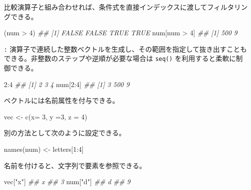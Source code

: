 \documentclass[
  letterpaper,
  xelatex,
  ja=standard, xelatex]{bxjsbook}
\newenvironment{Shaded}{\begin{snugshade}}{\end{snugshade}}
\newcommand{\AttributeTok}[1]{\textcolor[rgb]{0.40,0.45,0.13}{#1}}
\newcommand{\DecValTok}[1]{\textcolor[rgb]{0.68,0.00,0.00}{#1}}
\newcommand{\DocumentationTok}[1]{\textcolor[rgb]{0.37,0.37,0.37}{\textit{#1}}}
\newcommand{\FunctionTok}[1]{\textcolor[rgb]{0.28,0.35,0.67}{#1}}
\newcommand{\NormalTok}[1]{\textcolor[rgb]{0.00,0.23,0.31}{#1}}
\newcommand{\OtherTok}[1]{\textcolor[rgb]{0.00,0.23,0.31}{#1}}
\newcommand{\SpecialCharTok}[1]{\textcolor[rgb]{0.37,0.37,0.37}{#1}}
\newcommand{\StringTok}[1]{\textcolor[rgb]{0.13,0.47,0.30}{#1}}
\begin{document}
比較演算子と組み合わせれば、条件式を直接インデックスに渡してフィルタリングできる。

\begin{Shaded}
\begin{Highlighting}[]
\NormalTok{(num }\SpecialCharTok{\textgreater{}} \DecValTok{4}\NormalTok{)}
\DocumentationTok{\#\# [1] FALSE FALSE  TRUE  TRUE}
\NormalTok{num[num }\SpecialCharTok{\textgreater{}} \DecValTok{4}\NormalTok{]}
\DocumentationTok{\#\# [1] 500   9}
\end{Highlighting}
\end{Shaded}

\texttt{:}
演算子で連続した整数ベクトルを生成し、その範囲を指定して抜き出すこともできる。非整数のステップや逆順が必要な場合は
\texttt{seq()} を利用すると柔軟に制御できる。

\begin{Shaded}
\begin{Highlighting}[]
\DecValTok{2}\SpecialCharTok{:}\DecValTok{4}
\DocumentationTok{\#\# [1] 2 3 4}
\NormalTok{num[}\DecValTok{2}\SpecialCharTok{:}\DecValTok{4}\NormalTok{]}
\DocumentationTok{\#\# [1]   3 500   9}
\end{Highlighting}
\end{Shaded}

ベクトルには名前属性を付与できる。

\begin{Shaded}
\begin{Highlighting}[]
\NormalTok{vec }\OtherTok{\textless{}{-}} \FunctionTok{c}\NormalTok{(}\AttributeTok{x=} \DecValTok{3}\NormalTok{, }\AttributeTok{y =}\DecValTok{3}\NormalTok{, }\AttributeTok{z =} \DecValTok{4}\NormalTok{)}
\end{Highlighting}
\end{Shaded}

別の方法として次のように設定できる。

\begin{Shaded}
\begin{Highlighting}[]
\FunctionTok{names}\NormalTok{(num) }\OtherTok{\textless{}{-}}\NormalTok{ letters[}\DecValTok{1}\SpecialCharTok{:}\DecValTok{4}\NormalTok{]}
\end{Highlighting}
\end{Shaded}

名前を付けると、文字列で要素を参照できる。

\begin{Shaded}
\begin{Highlighting}[]
\NormalTok{vec[}\StringTok{"x"}\NormalTok{]}
\DocumentationTok{\#\# x }
\DocumentationTok{\#\# 3}
\NormalTok{num[}\StringTok{"d"}\NormalTok{]}
\DocumentationTok{\#\# d }
\DocumentationTok{\#\# 9}
\end{Highlighting}
\end{Shaded}
\end{document}
